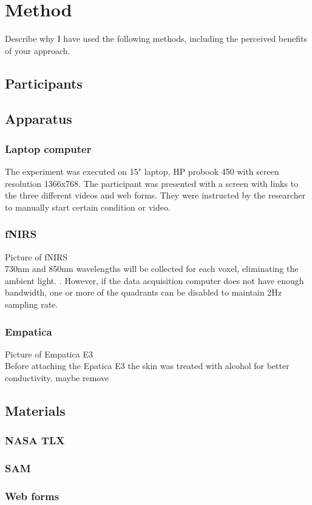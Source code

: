 \documentclass[a4paper]{report}
\begin{document}
	\section{Method}
	Describe why I have used the following methods, including the perceived benefits of your approach\cite{preferences-study}.
		\subsection{Participants}
		\subsection{Apparatus}
			\subsubsection{Laptop computer}
			The experiment was executed on 15" laptop, HP probook 450 with screen resolution 1366x768. The participant was presented with a screen with links to the three different videos and web forms. They were instructed by the researcher to manually start certain condition or video. 
			\subsubsection{fNIRS}
			Picture of fNIRS\\
			730nm and 850nm wavelengths will be collected for each voxel, eliminating the ambient light. . However, if the data acquisition computer does not have enough bandwidth,
			one or more of the quadrants can be disabled to maintain 2Hz sampling rate. 
			\subsubsection{Empatica}
			Picture of Empatica E3\\
			Before attaching the Epatica E3 the skin was treated with alcohol for better conductivity. maybe remove
        \subsection{Materials}
			\subsubsection{NASA TLX}
			\subsubsection{SAM}
			\subsubsection{Web forms}
\end{document}

